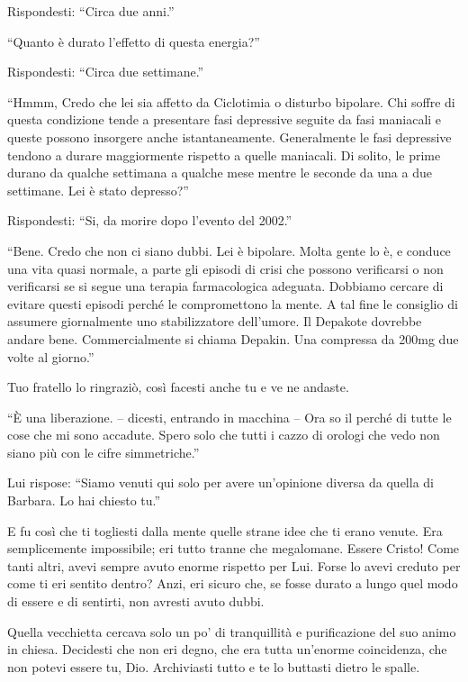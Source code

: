 Rispondesti: “Circa due anni.”

“Quanto è durato l'effetto di questa energia?”

Rispondesti: “Circa due settimane.”

“Hmmm, Credo che lei sia affetto da Ciclotimia o disturbo bipolare. Chi soffre di questa condizione tende a presentare fasi depressive seguite da fasi maniacali e queste possono insorgere anche istantaneamente. Generalmente le fasi depressive tendono a durare maggiormente rispetto a quelle maniacali. Di solito, le prime durano da qualche settimana a qualche mese mentre le seconde da una a due settimane. Lei è stato depresso?”

Rispondesti: “Si, da morire dopo l'evento del 2002.”

“Bene. Credo che non ci siano dubbi. Lei è bipolare. Molta gente lo è, e conduce una vita quasi normale, a parte gli episodi di crisi che possono verificarsi o non verificarsi se si segue una terapia farmacologica adeguata. Dobbiamo cercare di evitare questi episodi perché le compromettono la mente. A tal fine le consiglio di assumere giornalmente uno stabilizzatore dell'umore. Il Depakote dovrebbe andare bene. Commercialmente si chiama Depakin. Una compressa da 200mg due volte al giorno.”

Tuo fratello lo ringraziò, così facesti anche tu e ve ne andaste.

“È una liberazione. -- dicesti, entrando in macchina -- Ora so il perché di tutte le cose che mi sono accadute. Spero solo che tutti i cazzo di orologi che vedo non siano più con le cifre simmetriche.”

Lui rispose: “Siamo venuti qui solo per avere un'opinione diversa da quella di Barbara. Lo hai chiesto tu.”

E fu così che ti togliesti dalla mente quelle strane idee che ti erano venute. Era semplicemente impossibile; eri tutto tranne che megalomane. Essere Cristo! Come tanti altri, avevi sempre avuto enorme rispetto per Lui. Forse lo avevi creduto per come ti eri sentito dentro? Anzi, eri sicuro che, se fosse durato a lungo quel modo di essere e di sentirti, non avresti avuto dubbi.

Quella vecchietta cercava solo un po' di tranquillità e purificazione del suo animo in chiesa. Decidesti che non eri degno, che era tutta un'enorme coincidenza, che non potevi essere tu, Dio. Archiviasti tutto e te lo buttasti dietro le spalle.
